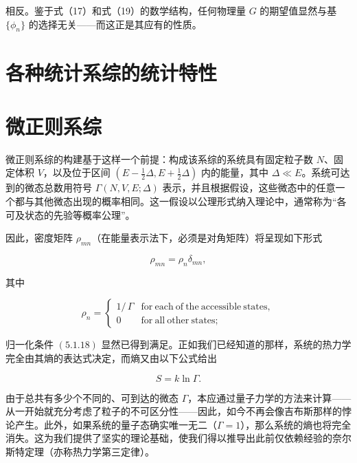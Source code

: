 相反。鉴于式（17）和式（19）的数学结构，任何物理量 \(G\) 的期望值显然与基 \(\{\phi_n\}\) 的选择无关------而这正是其应有的性质。

\section{各种统计系综的统计特性}\label{ux5404ux79cdux7edfux8ba1ux7cfbux7efcux7684ux7edfux8ba1ux7279ux6027}

\section{微正则系综}\label{a-ux5faeux89c2ux7edfux8ba1ux7cfbux7efc}

微正则系综的构建基于这样一个前提：构成该系综的系统具有固定粒子数 \(N\)、固定体积 \(V\)，以及位于区间 \((E-\frac{1}{2}\Delta, E+\frac{1}{2}\Delta)\) 内的能量，其中 \(\Delta \ll E\)。系统可达到的微态总数用符号 \(\Gamma(N,V,E;\Delta)\) 表示，并且根据假设，这些微态中的任意一个都与其他微态出现的概率相同。这一假设以公理形式纳入理论中，通常称为“各可及状态的先验等概率公理”。

因此，密度矩阵 \(\rho_{mn}\)（在能量表示法下，必须是对角矩阵）将呈现如下形式

\begin{equation}\tag{5.2.1}\label{eq:5.2.1}
\rho _ { m n } = \rho _ { n } \delta _ { m n } ,
\end{equation}

其中

\begin{equation}\tag{5.2.2}\label{eq:5.2.2}
\rho _ { n } = \left\{ \begin{array}{ll} { 1 / \, \Gamma } & { \mathrm { f o r ~ e a c h ~ o f ~ t h e ~ a c c e s s i b l e ~ s t a t e s , } } \\{ 0 } & { \mathrm { f o r ~ a l l ~ o t h e r ~ s t a t e s ; } } \end{array} \right.
\end{equation}

归一化条件 \((5.1.18)\) 显然已得到满足。正如我们已经知道的那样，系统的热力学完全由其熵的表达式决定，而熵又由以下公式给出

\begin{equation}\tag{5.2.3}\label{eq:5.2.3}
S = k \ln \Gamma .
\end{equation}

由于总共有多少个不同的、可到达的微态 \(\Gamma\)，本应通过量子力学的方法来计算------从一开始就充分考虑了粒子的不可区分性------因此，如今不再会像吉布斯那样的悖论产生。此外，如果系统的量子态确实唯一无二（\(\Gamma=1\)），那么系统的熵也将完全消失。这为我们提供了坚实的理论基础，使我们得以推导出此前仅依赖经验的奈尔斯特定理（亦称热力学第三定律）。

